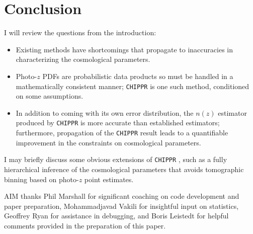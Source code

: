 \documentclass[preprint]{aastex}
\newcommand{\chippr}{\texttt{CHIPPR} }
\begin{document}
\section{Conclusion}
\label{sec:conclusion}

I will review the questions from the introduction:

\begin{itemize}
	\item Existing methods have shortcomings that propagate to inaccuracies 
in characterizing the cosmological parameters.
	\item Photo-$z$ PDFs are probabilistic data products so must be handled 
in a mathematically consistent manner; \chippr is one such method, conditioned 
on some assumptions.
	\item In addition to coming with its own error distribution, the $n(z)$ 
estimator produced by \chippr is more accurate than established estimators; 
furthermore, propagation of the \chippr result leads to a quantifiable 
improvement in the constraints on cosmological parameters.
\end{itemize}

I may briefly discuss some obvious extensions of \chippr, such as a fully 
hierarchical inference of the cosmological parameters that avoids tomographic 
binning based on photo-$z$ point estimates.



\begin{acknowledgements}
AIM thanks Phil Marshall for significant coaching on code development and paper 
preparation, Mohammadjavad Vakili for insightful input on statistics, Geoffrey 
Ryan for assistance in debugging, and Boris Leistedt for helpful comments 
provided in the preparation of this paper.
\end{acknowledgements}



\end{document}
